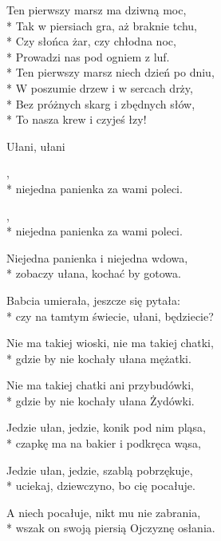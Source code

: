 \begin{lyrics}[longestline={\vin Ten pierwszy marsz niech dzień po dniu,}]
\vin Ten pierwszy marsz ma dziwną moc,\\*
\vin Tak w piersiach gra, aż braknie tchu,\\*
\vin Czy słońca żar, czy chłodna noc,\\*
\vin Prowadzi nas pod ogniem z luf.\\*
\smallskip
\vin Ten pierwszy marsz niech dzień po dniu,\\*
\vin W poszumie drzew i w sercach drży,\\*
\vin Bez próżnych skarg i zbędnych słów,\\*
\vin To nasza krew i czyjeś łzy!
\end{lyrics}



\song
{Ułani, ułani}

\begin{lyrics}[longestline={Nie ma takiej wioski, nie ma takiej chatki,}]

,\\*
niejedna panienka za wami poleci.

\begin{chorus}
,\\*
niejedna panienka za wami poleci.
\end{chorus}

Niejedna panienka i niejedna wdowa,\\*
zobaczy ułana, kochać by gotowa.

\chorusref

Babcia umierała, jeszcze się pytała:\\*
czy na tamtym świecie, ułani, będziecie?

\chorusref

Nie ma takiej wioski, nie ma takiej chatki,\\*
gdzie by nie kochały ułana mężatki.

\chorusref

Nie ma takiej chatki ani przybudówki,\\*
gdzie by nie kochały ułana Żydówki.

\chorusref

Jedzie ułan, jedzie, konik pod nim pląsa,\\*
czapkę ma na bakier i podkręca wąsa,

\chorusref

Jedzie ułan, jedzie, szablą pobrzękuje,\\*
uciekaj, dziewczyno, bo cię pocałuje.

\chorusref

A niech pocałuje, nikt mu nie zabrania,\\*
wszak on swoją piersią Ojczyznę osłania.

\chorusref
\end{lyrics}



